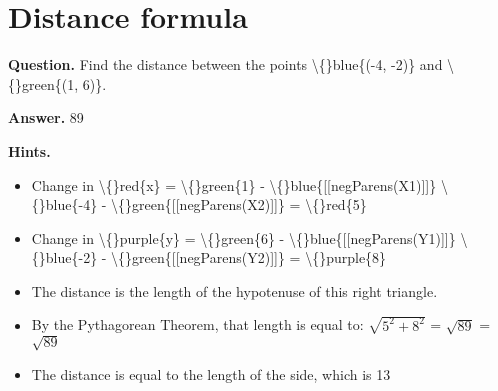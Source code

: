 \documentclass{article}
\begin{document}
\section*{Distance formula}
\textbf{Question.} Find the distance between the points
                    \textbackslash\{\}blue\{(-4, -2)\} and
                    \textbackslash\{\}green\{(1, 6)\}.

\textbf{Answer.} 89

\textbf{Hints.}
\begin{itemize}
  \item Change in \textbackslash\{\}red\{x\} = 
                    \textbackslash\{\}green\{1\} - \textbackslash\{\}blue\{[[negParens(X1)]]\}
                    \textbackslash\{\}blue\{-4\} - \textbackslash\{\}green\{[[negParens(X2)]]\}
                    = \textbackslash\{\}red\{5\}
  \item Change in \textbackslash\{\}purple\{y\} = 
                    \textbackslash\{\}green\{6\} - \textbackslash\{\}blue\{[[negParens(Y1)]]\}
                    \textbackslash\{\}blue\{-2\} - \textbackslash\{\}green\{[[negParens(Y2)]]\}
                    = \textbackslash\{\}purple\{8\}
  \item The distance is the length of the hypotenuse of this right triangle.
  \item By the Pythagorean Theorem, that length is equal to:
                $\sqrt{5^2 + 8^2}$
                = $\sqrt{89}$
                = $\sqrt{89}$
  \item The distance is equal to the length of the side, which is 13
\end{itemize}
\end{document}
